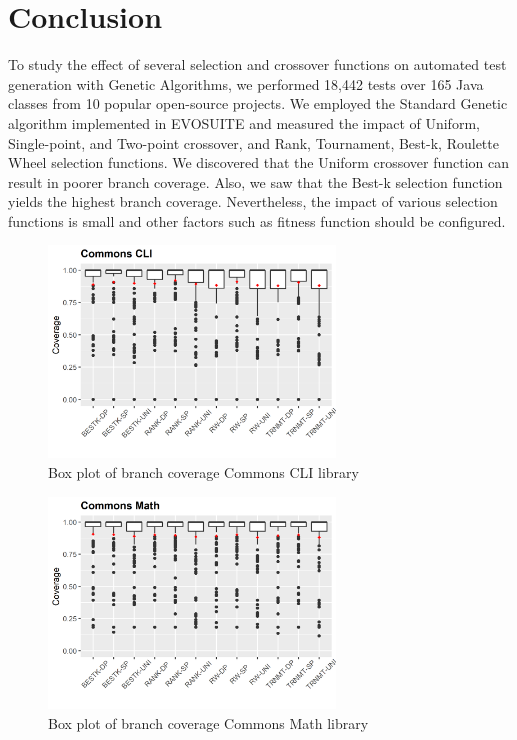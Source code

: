 \documentclass[sigconf]{acmart}
\begin{document}
\section{Conclusion}
\label{conclusion}
To study the effect of several selection and crossover functions on automated test generation with  
Genetic Algorithms, we performed 18,442 tests over 165 Java classes from 10 popular open-source projects. 
We employed the Standard Genetic algorithm implemented in EVOSUITE and measured the impact of 
Uniform, Single-point, and Two-point crossover, and Rank, Tournament, Best-k, Roulette Wheel selection functions.
We discovered that the Uniform crossover function can result in poorer branch coverage. Also, we saw that
the Best-k selection function yields the highest branch coverage. Nevertheless, the impact of various 
selection functions is small and other factors such as fitness function should be configured. 




\begin{figure}[h]
  \centering
  \includegraphics[width=3in]{../output/commons-cli-boxplot.png}
  \caption{Box plot of branch coverage Commons CLI library}
  \label{fig:boxplot1}
\end{figure}

\begin{figure}[h]
  \centering
  \includegraphics[width=3in]{../output/commons-math-boxplot.png}
  \caption{Box plot of branch coverage Commons Math library}
  \label{fig:boxplot2}
\end{figure}
\end{document}
